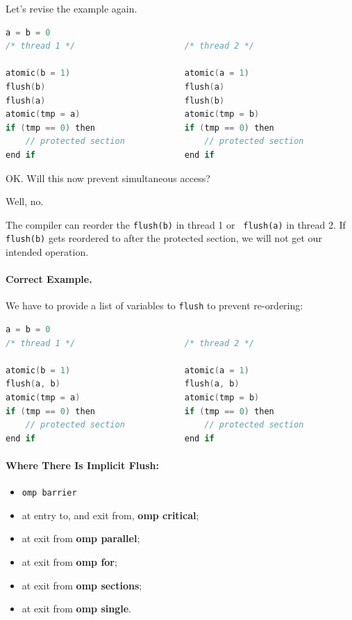 \documentclass[a4paper]{report}
\begin{document}
Let's revise the example again.
  \begin{lstlisting}[language=C]
                    a = b = 0
/* thread 1 */                      /* thread 2 */

atomic(b = 1)                       atomic(a = 1)
flush(b)                            flush(a)
flush(a)                            flush(b)
atomic(tmp = a)                     atomic(tmp = b)
if (tmp == 0) then                  if (tmp == 0) then
    // protected section                // protected section
end if                              end if
  \end{lstlisting}

OK. Will this now prevent simultaneous access?

Well, no.

The compiler can reorder the {\tt flush(b)} in thread 1 or {\tt
  flush(a)} in thread 2. If {\tt flush(b)} gets reordered to after the
protected section, we will not get our intended operation.

\paragraph{Correct Example.} We have to provide a list of variables
to {\tt flush} to prevent re-ordering:
  \begin{lstlisting}[language=C]
                    a = b = 0
/* thread 1 */                      /* thread 2 */

atomic(b = 1)                       atomic(a = 1)
flush(a, b)                         flush(a, b)
atomic(tmp = a)                     atomic(tmp = b)
if (tmp == 0) then                  if (tmp == 0) then
    // protected section                // protected section
end if                              end if
  \end{lstlisting}

\paragraph{Where There Is Implicit Flush:}
  \begin{itemize}[noitemsep]
    \item {\tt omp barrier}
    \item at entry to, and exit from, {\bf omp critical};
    \item at exit from {\bf omp parallel}; 
    \item at exit from {\bf omp for};
    \item at exit from {\bf omp sections};
    \item at exit from {\bf omp single}.
  \end{itemize}
\end{document}
